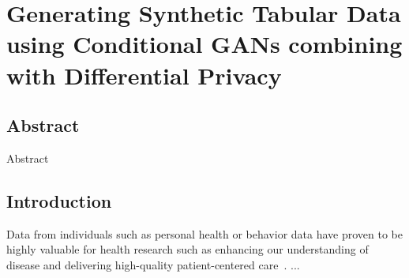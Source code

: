 \chapter{Generating Synthetic Tabular Data using Conditional GANs combining with Differential Privacy}
\papercitationChaSix
\clearpage
\newcommand{\dpcgans}{DP-CGANS}

\begin{refsection}
\section*{Abstract}Abstract

\cleardoublepage

\section{Introduction}
\label{intro}
Data from individuals such as personal health or behavior data have proven to be highly valuable for health research such as enhancing our understanding of disease and delivering high-quality patient-centered care~\cite{nass2009value,kalkman_patients_2022}. ...


\end{refsection}